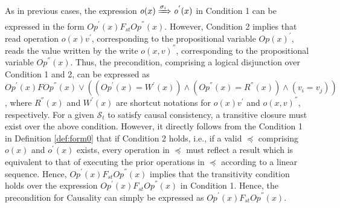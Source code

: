 \documentclass[journal,compsoc]{IEEEtran}
\begin{document}
  As in previous cases, the expression $\mathit{o}(x) \xRightarrow{\sigma_i} \mathit{o}^{'}(x)$ in Condition 1 %
  can be expressed in the
 form ${\mathit{Op}}^{'}(x) F_\mathit{st} {\mathit{Op}}^{''}(x)$. %
 However, Condition 2 implies that read operation $\mathit{o}(x){v}^{'}$, corresponding to the propositional variable ${\mathit{Op}}(x)^{'} $, reads the value
 written by the write $\mathit{o}(x,v)^{''}$, corresponding to the propositional variable  ${\mathit{Op}}^{''}(x)$. Thus, the precondition, comprising a logical disjunction over Condition 1 and 2, can be expressed as %
  $ {\mathit{Op}}^{'}(x) F {\mathit{Op}}^{''}(x) \vee
 \left( \left( {\mathit{Op}}^{'}(x) = {W}^{'}(x) \right) \wedge \left( {\mathit{Op}}^{''}(x) = {R}^{''}(x) \right) \wedge
   \left( v_i = v_j \right) \right)$, where $ {R}^{''}(x)$ and $ {W}^{'}(x)$ are shortcut notations for   $\mathit{o}(x){v}^{'}$ and $\mathit{o}(x,v)^{''}$, respectively. For a given $\mathcal{S}_t$ to satisfy causal consistency,  a transitive closure 
must exist over the above condition. %
  However, it directly follows from the Condition 1 in Definition \ref{def:form0} that if Condition 2 holds, i.e., if a valid $\preccurlyeq$ comprising $\mathit{o}(x)$  and $\mathit{o}^{'}(x) $ exists,  every operation in $ \preccurlyeq$ must reflect a result which is equivalent to that of executing the prior operations in $ \preccurlyeq$ according to a linear sequence. Hence, ${\mathit{Op}}^{'}(x) F_\mathit{st} {\mathit{Op}}^{''}(x)$ implies that the transitivity condition holds over the expression ${\mathit{Op}}^{'}(x) F_\mathit{st} {\mathit{Op}}^{''}(x)$  in Condition 1. Hence, the precondition for Causality can simply be expressed as ${\mathit{Op}}^{'}(x)  F_\mathit{st}  {\mathit{Op}}^{''}(x)$. %
\end{document}
